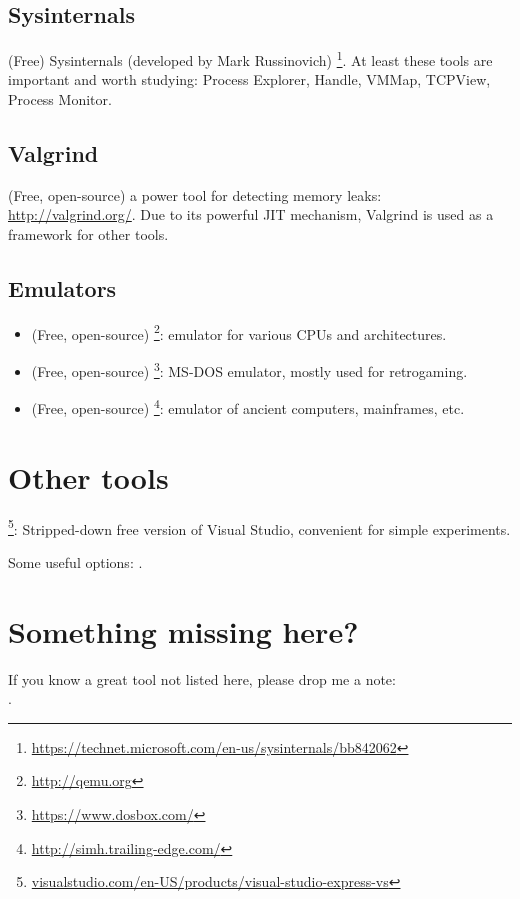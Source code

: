 \subsection{Sysinternals}

(Free) Sysinternals (developed by Mark Russinovich)
\footnote{\url{https://technet.microsoft.com/en-us/sysinternals/bb842062}}.
At least these tools are important and worth studying: Process Explorer, Handle, VMMap, TCPView, Process Monitor.

\subsection{Valgrind}

(Free, open-source) a power tool for detecting memory leaks: \url{http://valgrind.org/}.
Due to its powerful \ac{JIT} mechanism, Valgrind is used as a framework for other tools.


\subsection{Emulators}

\begin{itemize}
\item (Free, open-source) \footnote{\url{http://qemu.org}}: emulator for various CPUs and architectures.

\item (Free, open-source) \footnote{\url{https://www.dosbox.com/}}: MS-DOS emulator, mostly used for retrogaming.

\item (Free, open-source) \footnote{\url{http://simh.trailing-edge.com/}}: emulator of ancient computers, mainframes, etc.
\end{itemize}

\section{Other tools}

\footnote{\href{http://go.yurichev.com/17034}{visualstudio.com/en-US/products/visual-studio-express-vs}}:
Stripped-down free version of Visual Studio, convenient for simple experiments.

Some useful options: .

\section{Something missing here?}

If you know a great tool not listed here, please drop me a note:\\
\TT{\EMAIL}.

